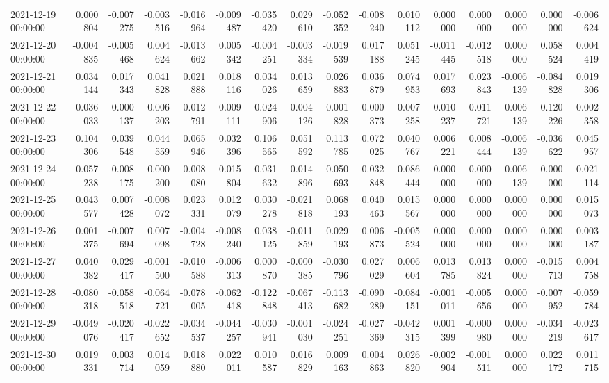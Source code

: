\begin{tabular}{lrrrrrrrrrrrrrrr}
2021-12-19 00:00:00 & 0.000804 & -0.007275 & -0.003516 & -0.016964 & -0.009487 & -0.035420 & 0.029610 & -0.052352 & -0.008240 & 0.010112 & 0.000000 & 0.000000 & 0.000000 & 0.000000 & -0.006624 \\
2021-12-20 00:00:00 & -0.004835 & -0.005468 & 0.004624 & -0.013662 & 0.005342 & -0.004251 & -0.003334 & -0.019539 & 0.017188 & 0.051245 & -0.011445 & -0.012518 & 0.000000 & 0.058524 & 0.004419 \\
2021-12-21 00:00:00 & 0.034144 & 0.017343 & 0.041828 & 0.021888 & 0.018116 & 0.034026 & 0.013659 & 0.026883 & 0.036879 & 0.074953 & 0.017693 & 0.023843 & -0.006139 & -0.084828 & 0.019306 \\
2021-12-22 00:00:00 & 0.036033 & 0.000137 & -0.006203 & 0.012791 & -0.009111 & 0.024906 & 0.004126 & 0.001828 & -0.000373 & 0.007258 & 0.010237 & 0.011721 & -0.006139 & -0.120226 & -0.002358 \\
2021-12-23 00:00:00 & 0.104306 & 0.039548 & 0.044559 & 0.065946 & 0.032396 & 0.106565 & 0.051592 & 0.113785 & 0.072025 & 0.040767 & 0.006221 & 0.008444 & -0.006139 & -0.036622 & 0.045957 \\
2021-12-24 00:00:00 & -0.057238 & -0.008175 & 0.000200 & 0.008080 & -0.015804 & -0.031632 & -0.014896 & -0.050693 & -0.032848 & -0.086444 & 0.000000 & 0.000000 & -0.006139 & 0.000000 & -0.021114 \\
2021-12-25 00:00:00 & 0.043577 & 0.007428 & -0.008072 & 0.023331 & 0.012079 & 0.030278 & -0.021818 & 0.068193 & 0.040463 & 0.015567 & 0.000000 & 0.000000 & 0.000000 & 0.000000 & 0.015073 \\
2021-12-26 00:00:00 & 0.001375 & -0.007694 & 0.007098 & -0.004728 & -0.008240 & 0.038125 & -0.011859 & 0.029193 & 0.006873 & -0.005524 & 0.000000 & 0.000000 & 0.000000 & 0.000000 & 0.003187 \\
2021-12-27 00:00:00 & 0.040382 & 0.029417 & -0.001500 & -0.010588 & -0.006313 & 0.000870 & -0.000385 & -0.030796 & 0.027029 & 0.006604 & 0.013785 & 0.013824 & 0.000000 & -0.015713 & 0.004758 \\
2021-12-28 00:00:00 & -0.080318 & -0.058518 & -0.064721 & -0.078005 & -0.062418 & -0.122848 & -0.067413 & -0.113682 & -0.090289 & -0.084151 & -0.001011 & -0.005656 & 0.000000 & -0.007952 & -0.059784 \\
2021-12-29 00:00:00 & -0.049076 & -0.020417 & -0.022652 & -0.034537 & -0.044257 & -0.030941 & -0.001030 & -0.024251 & -0.027369 & -0.042315 & 0.001399 & -0.000980 & 0.000000 & -0.034219 & -0.023617 \\
2021-12-30 00:00:00 & 0.019331 & 0.003714 & 0.014059 & 0.018880 & 0.022011 & 0.010587 & 0.016829 & 0.009163 & 0.004863 & 0.026820 & -0.002904 & -0.001511 & 0.000000 & 0.022172 & 0.011715 \\

\end{tabular}
